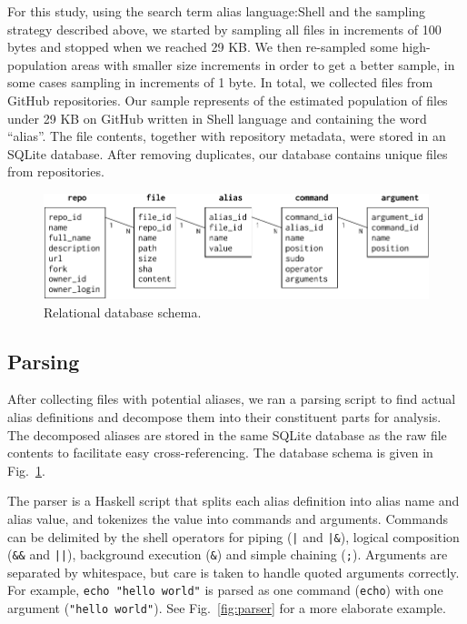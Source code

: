 \documentclass[smallextended,natbib]{svjour3}
\newcommand{\num}[1]{\numprint{#1}}
\newcommand{\per}[1]{\numprint[\%]{#1}}
\newenvironment{CVerbatim}
  {\center\BVerbatim}
  {\endBVerbatim\endcenter}
\begin{document}
For this study, using the search term
\begin{CVerbatim}
alias language:Shell
\end{CVerbatim}
and the sampling strategy described above, we started by sampling all files in increments of 100 bytes and stopped when we reached 29 KB.
We then re-sampled some high-population areas with smaller size increments in order to get a better sample, in some cases sampling in increments of 1 byte.
In total, we collected \num{844140} files from \num{304361} GitHub repositories.
Our sample represents \per{94.09} of the estimated population of \num{897182} files under 29 KB on GitHub written in Shell language and containing the word ``alias''.
The file contents, together with repository metadata, were stored in an SQLite database.
After removing duplicates, our database contains \num{372816} unique files from \num{205126} repositories.

\begin{figure}
    \centering
    \includegraphics[width=\columnwidth]{fig-schema.pdf}
    \caption{Relational database schema.}
    \label{fig:schema}
\end{figure}

\subsection{Parsing}

After collecting files with potential aliases, we ran a parsing script to find actual alias definitions and decompose them into their constituent parts for analysis.
The decomposed aliases are stored in the same SQLite database as the raw file contents to facilitate easy cross-referencing.
The database schema is given in Fig.~\ref{fig:schema}.

The parser is a Haskell script that splits each alias definition into alias name and alias value, and tokenizes the value into commands and arguments.
Commands can be delimited by the shell operators for piping (\verb!|! and \verb!|&!), logical composition (\verb|&&| and \verb!||!), background execution (\verb|&|) and simple chaining (\verb|;|).
Arguments are separated by whitespace, but care is taken to handle quoted arguments correctly. 
For example, \verb|echo "hello world"| is parsed as one command (\texttt{echo}) with one argument (\texttt{"hello world"}).
See Fig.~\ref{fig:parser} for a more elaborate example.
\end{document}
